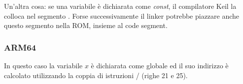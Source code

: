 \myindex{\ROM}

Un'altra cosa: se una variabile è dichiarata come \emph{const}, il compilatore Keil la colloca nel segmento .
Forse successivamente il linker potrebbe piazzare anche questo segmento nella ROM, insieme al code segment.

\subsubsection{ARM64}




In questo caso la variabile $x$ è dichiarata come globale ed il suo indirizzo è calcolato utilizzando la coppia di istruzioni 
/ (righe 21 e 25).

